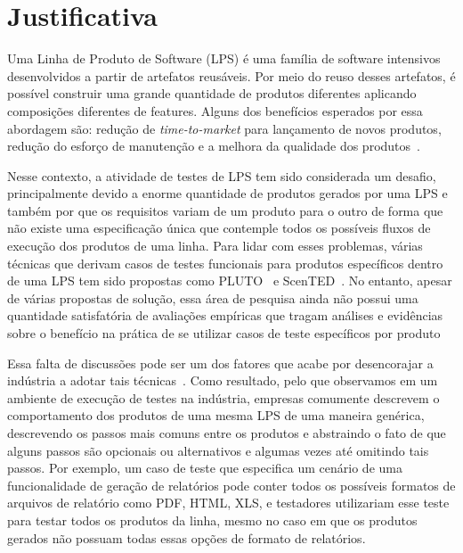 \section{Justificativa}

\label{sec:justificativa}



Uma Linha de Produto de Software (LPS) é uma família de software intensivos desenvolvidos a partir de artefatos reusáveis. Por meio do reuso desses artefatos, é possível construir uma grande quantidade de produtos diferentes aplicando composições diferentes de features. Alguns dos benefícios esperados por essa abordagem são: redução de \emph{time-to-market} para lançamento de novos produtos, redução do esforço de manutenção e a melhora da qualidade dos produtos~\cite{pohl-book}.

Nesse contexto, a atividade de testes de LPS tem sido considerada um desafio,
principalmente devido a enorme quantidade de produtos gerados por uma LPS e
também por que os requisitos variam de um produto para o outro de forma que não
existe uma especificação única que contemple todos os possíveis fluxos de execução dos
produtos de uma linha. Para lidar com esses problemas, várias técnicas que
derivam casos de testes funcionais para produtos específicos dentro de uma LPS
tem sido propostas como PLUTO~\cite{Bertolino:pluto} e
ScenTED~\cite{Pohl:scented}. No entanto, apesar de várias propostas de solução, 
essa área de pesquisa ainda não possui uma quantidade satisfatória de avaliações
empíricas que tragam análises e evidências sobre o benefício na prática de se
utilizar casos de teste específicos por produto

Essa falta de discussões pode ser um dos fatores que acabe por desencorajar a
indústria a adotar tais técnicas~\cite{Tevanlinna:spltesting, Engstrom2011}.
Como resultado, pelo que observamos em um ambiente de execução de testes na
indústria, empresas comumente descrevem o comportamento dos produtos de uma
mesma LPS de uma maneira genérica, descrevendo os passos mais comuns entre os
produtos e abstraindo o fato de que alguns passos são opcionais ou alternativos
e algumas vezes até omitindo tais passos. Por exemplo, um caso de teste que
especifica um cenário de uma funcionalidade de geração de relatórios pode conter
todos os possíveis formatos de arquivos de relatório como PDF, HTML, XLS, e
testadores utilizariam esse teste para testar todos os produtos da linha, mesmo
no caso em que os produtos gerados não possuam todas essas opções de formato de
relatórios. 

